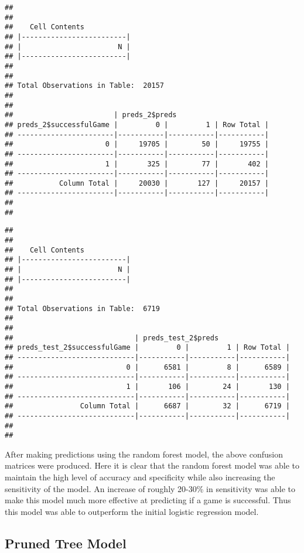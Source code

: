 \documentclass[]{article}
\begin{document}
\begin{verbatim}
## 
##  
##    Cell Contents
## |-------------------------|
## |                       N |
## |-------------------------|
## 
##  
## Total Observations in Table:  20157 
## 
##  
##                        | preds_2$preds 
## preds_2$successfulGame |         0 |         1 | Row Total | 
## -----------------------|-----------|-----------|-----------|
##                      0 |     19705 |        50 |     19755 | 
## -----------------------|-----------|-----------|-----------|
##                      1 |       325 |        77 |       402 | 
## -----------------------|-----------|-----------|-----------|
##           Column Total |     20030 |       127 |     20157 | 
## -----------------------|-----------|-----------|-----------|
## 
## 
\end{verbatim}

\begin{verbatim}
## 
##  
##    Cell Contents
## |-------------------------|
## |                       N |
## |-------------------------|
## 
##  
## Total Observations in Table:  6719 
## 
##  
##                             | preds_test_2$preds 
## preds_test_2$successfulGame |         0 |         1 | Row Total | 
## ----------------------------|-----------|-----------|-----------|
##                           0 |      6581 |         8 |      6589 | 
## ----------------------------|-----------|-----------|-----------|
##                           1 |       106 |        24 |       130 | 
## ----------------------------|-----------|-----------|-----------|
##                Column Total |      6687 |        32 |      6719 | 
## ----------------------------|-----------|-----------|-----------|
## 
## 
\end{verbatim}

After making predictions using the random forest model, the above
confusion matrices were produced. Here it is clear that the random
forest model was able to maintain the high level of accuracy and
specificity while also increasing the sensitivity of the model. An
increase of roughly 20-30\% in sensitivity was able to make this model
much more effective at predicting if a game is successful. Thus this
model was able to outperform the initial logistic regression model.

\hypertarget{pruned-tree-model}{%
\subsection{Pruned Tree Model}\label{pruned-tree-model}}
\end{document}
